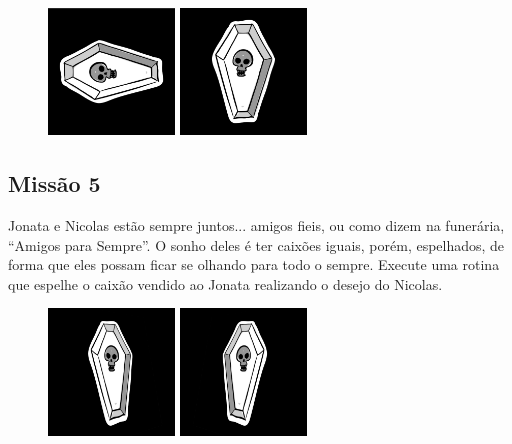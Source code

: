 \documentclass[
	12pt,				%
	oneside,			%
	a4paper,			%
	english,			%
	french,				%
	spanish,			%
	brazil,				%
	]{abntex2}
\begin{document}
\begin{apendicesenv}
\begin{figure}[H]
\centering
\includegraphics[width=0.3\textwidth]{imagens/desafios/coffin2dhorizon.jpg}
\includegraphics[width=0.3\textwidth]{imagens/desafios/mission4.png}
\end{figure}

\subsection{Missão 5}

Jonata e Nicolas estão sempre juntos... amigos fieis, ou como dizem na funerária, “Amigos para Sempre”. O sonho deles é ter caixões iguais, porém, espelhados, de forma que eles possam ficar se olhando para todo o sempre. Execute uma rotina que espelhe o caixão vendido ao Jonata realizando o desejo do Nicolas.

\begin{figure}[ht]
\centering
\includegraphics[width=0.3\textwidth]{imagens/desafios/conffin3d.jpg}
\includegraphics[width=0.3\textwidth]{imagens/desafios/mission5.png}
\end{figure}


\end{apendicesenv}
\end{document}
